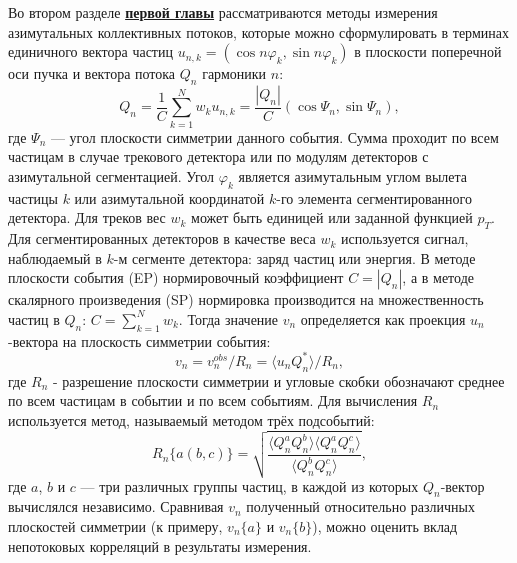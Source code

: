 Во втором разделе \underline{\textbf{первой главы}}  рассматриваются методы измерения азимутальных коллективных потоков, которые можно сформулировать в терминах  единичного вектора частиц $u_{n,k} = ( \cos n\varphi_k, \sin n\varphi_k )$ в плоскости поперечной оси пучка и
вектора потока $Q_n$ гармоники $n$:
\begin{equation}
    Q_n = \frac{1}{C} \sum_{k=1}^{N} w_k u_{n,k} = \frac{|Q_n|}{C} (\cos{\Psi_n}, \sin{\Psi_n}) ,
\end{equation}
где $\Psi_n$ --- угол плоскости симметрии данного события. 
Сумма проходит по всем частицам  в случае трекового детектора  или по модулям детекторов с азимутальной сегментацией. 
Угол $\varphi_k$ является азимутальным углом вылета частицы $k$ или азимутальной координатой $k$-го элемента сегментированного детектора. 
Для треков  вес $w_k$  может быть единицей или заданной функцией $p_T$. 
Для сегментированных детекторов в качестве веса $w_k$ используется сигнал, наблюдаемый в $k$-м сегменте детектора: заряд частиц или энергия. 
В методе плоскости события (EP) нормировочный коэффициент $C=|Q_n|$, а в методе  скалярного произведения (SP) нормировка производится на множественность частиц в $Q_n$:  $C=\sum_{k=1}^N w_k$. 
Тогда значение $v_n$ определяется как проекция $u_n$-вектора на плоскость симметрии события:
\begin{equation}
    v_n = v_n^{obs}/R_n =  \langle u_n Q_n^* \rangle/R_n, \label{eq:v1_formula}
\end{equation}
где $R_n$ - разрешение плоскости симметрии и угловые скобки обозначают среднее по всем частицам в событии и по всем событиям. 
Для вычисления $R_n$  используется метод, называемый методом трёх подсобытий:
%
\begin{equation}
    R_n\{a(b,c)\}  =  \sqrt { \frac{ \langle Q_n^a Q_n^b \rangle \langle Q_n^a Q_n^c \rangle }{ \langle Q_n^b Q_n^c \rangle} },
\end{equation}
%
где $a$, $b$ и $c$ --- три различных группы частиц, в каждой из которых $Q_n$-вектор вычислялся независимо.
Сравнивая $v_n$ полученный относительно различных плоскостей симметрии (к примеру, $v_n\{a\}$ и $v_n\{b\}$), можно оценить вклад непотоковых корреляций в результаты измерения. 

